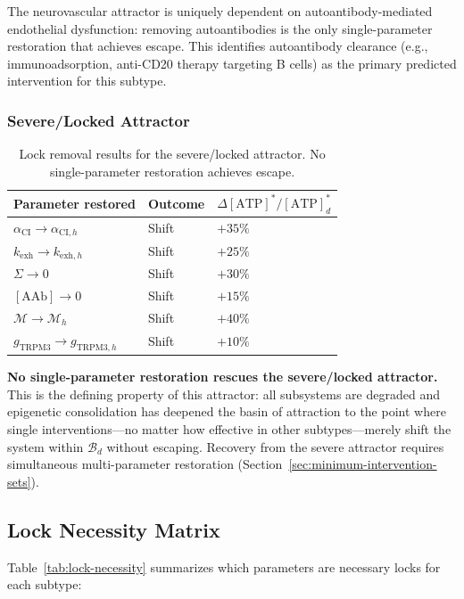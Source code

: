 The neurovascular attractor is uniquely dependent on autoantibody-mediated endothelial dysfunction: removing autoantibodies is the only single-parameter restoration that achieves escape. This identifies autoantibody clearance (e.g., immunoadsorption, anti-CD20 therapy targeting B cells) as the primary predicted intervention for this subtype.

\subsubsection{Severe/Locked Attractor}

\begin{table}[htbp]
\centering
\caption{Lock removal results for the severe/locked attractor. No single-parameter restoration achieves escape.}
\label{tab:lock-severe}
\begin{tabular}{lll}
\hline
Parameter restored & Outcome & $\Delta[\text{ATP}]^*/[\text{ATP}]_d^*$ \\
\hline
$\alpha_{\text{CI}} \to \alpha_{\text{CI},h}$ & Shift & $+35\%$ \\
$k_{\text{exh}} \to k_{\text{exh},h}$ & Shift & $+25\%$ \\
$\Sigma \to 0$ & Shift & $+30\%$ \\
$[\text{AAb}] \to 0$ & Shift & $+15\%$ \\
$\mathcal{M} \to \mathcal{M}_h$ & Shift & $+40\%$ \\
$g_{\text{TRPM3}} \to g_{\text{TRPM3},h}$ & Shift & $+10\%$ \\
\hline
\end{tabular}
\end{table}

\textbf{No single-parameter restoration rescues the severe/locked attractor.} This is the defining property of this attractor: all subsystems are degraded and epigenetic consolidation has deepened the basin of attraction to the point where single interventions---no matter how effective in other subtypes---merely shift the system within $\mathcal{B}_d$ without escaping. Recovery from the severe attractor requires simultaneous multi-parameter restoration (Section~\ref{sec:minimum-intervention-sets}).

\subsection{Lock Necessity Matrix}

Table~\ref{tab:lock-necessity} summarizes which parameters are necessary locks for each subtype:

